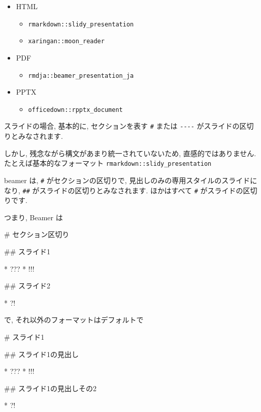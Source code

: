 \documentclass[
]{bxjsarticle}
\newenvironment{Shaded}{\begin{snugshade}}{\end{snugshade}}
\newcommand{\FunctionTok}[1]{\textcolor[rgb]{0.00,0.00,0.00}{#1}}
\newcommand{\NormalTok}[1]{#1}
\newcommand{\SpecialStringTok}[1]{\textcolor[rgb]{0.31,0.60,0.02}{#1}}
\providecommand{\tightlist}{%
  \setlength{\itemsep}{0pt}\setlength{\parskip}{0pt}}
\begin{document}
\begin{itemize}
\tightlist
\item
  HTML

  \begin{itemize}
  \tightlist
  \item
    \texttt{rmarkdown::slidy\_presentation}
  \item
    \texttt{xaringan::moon\_reader}
  \end{itemize}
\item
  PDF

  \begin{itemize}
  \tightlist
  \item
    \texttt{rmdja::beamer\_presentation\_ja}
  \end{itemize}
\item
  PPTX

  \begin{itemize}
  \tightlist
  \item
    \texttt{officedown::rpptx\_document}
  \end{itemize}
\end{itemize}

スライドの場合, 基本的に, セクションを表す \texttt{\#} または \texttt{-\/-\/-\/-} がスライドの区切りとみなされます.

しかし, 残念ながら構文があまり統一されていないため, 直感的ではありません. たとえば基本的なフォーマット \texttt{rmarkdown::slidy\_presentation}

beamer は, \texttt{\#} がセクションの区切りで, 見出しのみの専用スタイルのスライドになり, \texttt{\#\#} がスライドの区切りとみなされます. ほかはすべて \texttt{\#} がスライドの区切りです.

つまり, Beamer は

\begin{Shaded}
\begin{Highlighting}[]
\FunctionTok{\# セクション区切り}

\FunctionTok{\#\# スライド1}

\SpecialStringTok{* }\NormalTok{???}
\SpecialStringTok{* }\NormalTok{!!!}

\FunctionTok{\#\# スライド2}

\SpecialStringTok{* }\NormalTok{?!}
\end{Highlighting}
\end{Shaded}

で, それ以外のフォーマットはデフォルトで

\begin{Shaded}
\begin{Highlighting}[]
\FunctionTok{\# スライド1}

\FunctionTok{\#\# スライド1の見出し}

\SpecialStringTok{* }\NormalTok{???}
\SpecialStringTok{* }\NormalTok{!!!}

\FunctionTok{\#\# スライド1の見出しその2}

\SpecialStringTok{* }\NormalTok{?!}
\end{Highlighting}
\end{Shaded}
\end{document}
